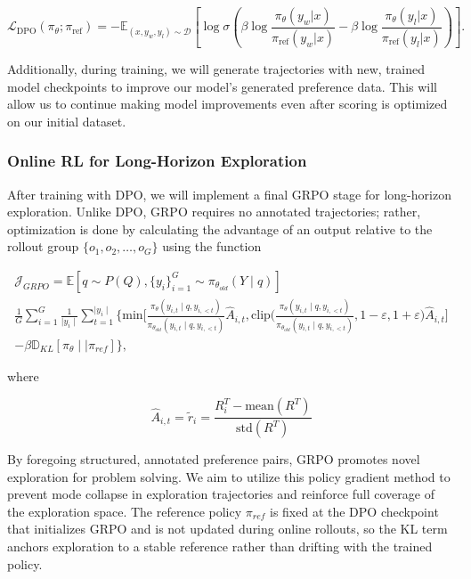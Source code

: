 \documentclass[thesis,letterpaper,12pt]{utthesis}
\begin{document}
\[
\mathcal{L}_{\text{DPO}}(\pi_\theta; \pi_{\text{ref}}) = -\mathbb{E}_{(x, y_w, y_l) \sim \mathcal{D}} \left[ \log \sigma \left( \beta \log \frac{\pi_\theta(y_w | x)}{\pi_{\text{ref}}(y_w | x)} - \beta \log \frac{\pi_\theta(y_l | x)}{\pi_{\text{ref}}(y_l | x)} \right) \right].
\]

Additionally, during training, we will generate trajectories with new, trained model checkpoints to improve our model's generated preference data. This will allow us to continue making model improvements even after scoring is optimized on our initial dataset.

\subsubsection{Online RL for Long-Horizon Exploration}
After training with DPO, we will implement a final GRPO stage for long-horizon exploration. Unlike DPO, GRPO requires no annotated trajectories; rather, optimization is done by calculating the advantage of an output relative to the rollout group $\{o_1, o_2, \dots, o_G\}$ using the function

\begin{multline*}
    \mathcal{J}_{GRPO} = \mathbb{E}[q \sim P(Q), \{y_i\}_{i=1}^{G} \sim \pi_{\theta_{old}}(Y\mid q)] \\
    \frac{1}{G} \sum_{i=1}^{G}\frac{1}{\mid y_i \mid} \sum_{t=1}^{\mid y_i \mid} \Bigg \{ \text{min} \Big [ \frac{\pi_\theta (y_{i,t}\mid q, y_{i, <t})}{\pi_{\theta_{old}}(y_{i,t}\mid q, y_{i, <t})} \hat A_{i,t}, \text{clip} \Big( \frac{\pi_\theta (y_{i,t}\mid q, y_{i, <t})}{\pi_{\theta_{old}}(y_{i,t}\mid q, y_{i, <t})}, 1 - \varepsilon, 1 + \varepsilon \Big) \hat A_{i,t} \Big] \\
    - \beta \mathbb{D}_{KL} [\pi_\theta \mid\mid \pi_{ref}] \Bigg \},
\end{multline*}

where 

\[
\hat A_{i,t} = \tilde{r}_i  = \frac{R^{T}_i - \text{mean}(R^{T})}{\text{std}(R^{T})}
\]

By foregoing structured, annotated preference pairs, GRPO promotes novel exploration for problem solving. We aim to utilize this policy gradient method to prevent mode collapse in exploration trajectories and reinforce full coverage of the exploration space. The reference policy $\pi_{ref}$ is fixed at the DPO checkpoint that initializes GRPO and is not updated during online rollouts, so the KL term anchors exploration to a stable reference rather than drifting with the trained policy.
\end{document}
